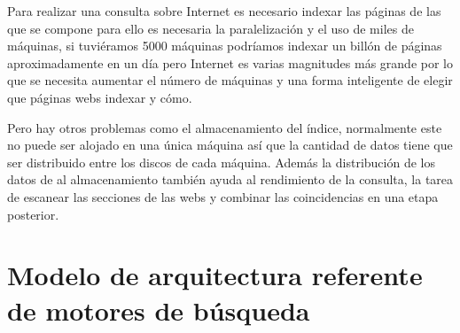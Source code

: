 \documentclass[a4paper, 11pt]{article} %
\begin{document}
	Para realizar una consulta sobre Internet es necesario indexar las páginas de las que se compone para ello es necesaria la paralelización y el uso de miles de máquinas, si tuviéramos 5000 máquinas podríamos indexar un billón de páginas aproximadamente en un día pero Internet es varias magnitudes más grande por lo que se necesita aumentar el número de máquinas y una forma inteligente de elegir que páginas webs indexar y cómo.

	Pero hay otros problemas como el almacenamiento del índice, normalmente este no puede ser alojado en una única máquina así que la cantidad de datos tiene que ser distribuido entre los discos de cada máquina. Además la distribución de los datos de al almacenamiento también ayuda al rendimiento de la consulta, la tarea de escanear las secciones de las webs y combinar las coincidencias en una etapa posterior.

	\section{Modelo de arquitectura referente de motores de búsqueda}
\end{document}
